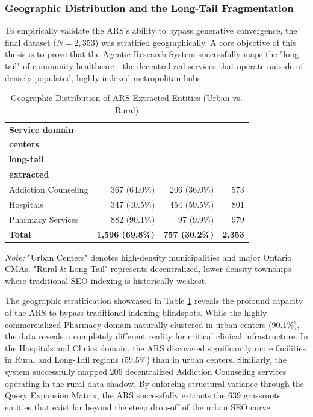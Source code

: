 \documentclass[12pt,oneside]{report}
\begin{document}
\subsubsection{Geographic Distribution and the Long-Tail Fragmentation}
To empirically validate the ARS's ability to bypass generative convergence, the final dataset ($N=2,353$) was stratified geographically. A core objective of this thesis is to prove that the Agentic Research System successfully maps the "long-tail" of community healthcare—the decentralized services that operate outside of densely populated, highly indexed metropolitan hubs. 
\begin{table}[htbp]
\caption{Geographic Distribution of ARS Extracted Entities (Urban vs. Rural)}
\label{tab:ars_geo_distribution}
\centering
\begin{tabularx}{\textwidth}{@{}Xrrr@{}}
\toprule
\textbf{Service domain} & \makecell{\textbf{Urban}\\\textbf{centers}} & \makecell{\textbf{Rural /}\\\textbf{long-tail}} & \makecell{\textbf{Total}\\\textbf{extracted}} \\
\midrule
Addiction Counseling & 367 (64.0\%) & 206 (36.0\%) & 573 \\
Hospitals & 347 (40.5\%) & 454 (59.5\%) & 801 \\
Pharmacy Services & 882 (90.1\%) & 97 (9.9\%) & 979 \\
\midrule
\textbf{Total} & \textbf{1,596 (69.8\%)} & \textbf{757 (30.2\%)} & \textbf{2,353} \\
\bottomrule
\end{tabularx}
\footnotesize{\textit{Note:} "Urban Centers" denotes high-density municipalities and major Ontario CMAs. "Rural \& Long-Tail" represents decentralized, lower-density townships where traditional SEO indexing is historically weakest.}
\end{table}

The geographic stratification showcased in Table \ref{tab:ars_geo_distribution} reveals the profound capacity of the ARS to bypass traditional indexing blindspots. While the highly commercialized Pharmacy domain naturally clustered in urban centers (90.1\%), the data reveals a completely different reality for critical clinical infrastructure. In the Hospitals and Clinics domain, the ARS discovered significantly more facilities in Rural and Long-Tail regions (59.5\%) than in urban centers. Similarly, the system successfully mapped 206 decentralized Addiction Counseling services operating in the rural data shadow. By enforcing structural variance through the Query Expansion Matrix, the ARS successfully extracts the 639 grassroots entities that exist far beyond the steep drop-off of the urban SEO curve.
\end{document}
